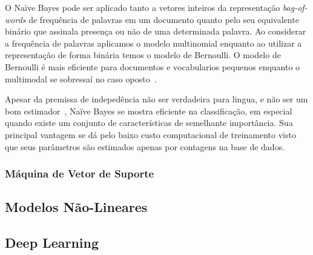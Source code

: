 O Naïve Bayes pode ser aplicado tanto a vetores inteiros da representação
\textit{bag-of-words} de frequência de palavras em um documento quanto pelo seu
equivalente binário que assinala presença ou não de uma determinada palavra.
Ao considerar a frequência de palavras aplicamos o modelo multinomial enquanto
ao utilizar a representação de forma binária temos o modelo de Bernoulli.
O modelo de Bernoulli é mais eficiente para documentos e vocabularios pequenos
enquanto o multimodal se sobressaí no caso oposto~\cite{schutze08}.

Apesar da premissa de indepedência não ser verdadeira para lingua, e não ser um
bom estimador~\cite{schutze08}, Naïve Bayes se mostra eficiente na
classificação, em especial quando existe um conjunto de características de
semelhante importância.
Sua principal vantagem se dá pelo baixo custo computacional de treinamento visto
que seus parâmetros são estimados apenas por contagens na base de dados.

\subsubsection{Máquina de Vetor de Suporte}

\subsection{Modelos Não-Lineares}

\subsection{Deep Learning}




